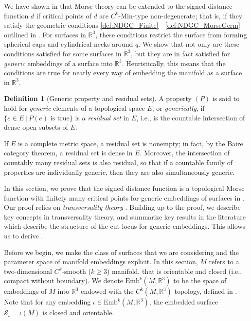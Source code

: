\documentclass[11pt]{article}
\newcommand{\R}{\mathbb{R}}
\newcommand{\Emb}{\mathrm{Emb}^k(M,\R^3)}
\newcommand{\Surf}{\mathcal{S}}
\theoremstyle{plain}
\theoremstyle{definition}
\newtheorem{defi}{Definition}
\theoremstyle{remark}
\begin{document}
We have shown in  that Morse theory can be extended to the signed distance function $d$ if critical points of $d$ are $C^k$-Min-type non-degenerate; that is, if they satisfy the  geometric conditions \ref{def:NDGC_Finite} - \ref{def:NDGC_MorseGerm} outlined in . 
For surfaces in $\R^3$, these conditions restrict the surface from forming spherical caps and cylindrical necks around $q$. 
We show that not only are these conditions satisfied for some surfaces in $\R^3$, but they are in fact satisfied for \textit{generic} embeddings of a surface into $\R^3$. 
Heuristically, this means that the conditions are true for nearly every way of embedding the manifold as a surface in $\R^3$. 

\begin{defi}[Generic property and residual sets]
A property $(P)$ is said to hold for \emph{generic} elements of a topological space $E$, or \emph{generically}, if 
$\{e \in E ~|~ P(e) \text{ is true} \}$
is a \emph{residual set} in $E$, i.e.,
is the countable intersection of dense open subsets of $E$.
\end{defi}

If $E$ is a complete metric space, a residual set is nonempty; in fact, by the Baire category theorem, a residual set is dense in $E$. Moreover, the intersection of countably many residual sets is also residual, so that if a countable family of properties are individually generic, then they are also simultaneously generic.

In this section, we prove that the signed distance function is a topological Morse function with finitely many critical points for generic embeddings of surfaces in . Our proof relies on \emph{transversality theory} \citep{guillemin_differential_2010}. Building up to the proof, we describe key concepts in transversality theory, and summarize key results in the literature which describe the structure of the cut locus for generic embeddings. This allows us to derive .


Before we begin, we make the class of surfaces that we are considering and the parameter space of manifold embeddings explicit. In this section, $M$ refers to a two-dimensional $C^k$-smooth ($k \geq 3$) manifold, that is orientable and closed (i.e., compact without boundary).
We denote $\Emb$ to be the space of embeddings of $M$ into $\R^3$ endowed with the $C^k(M,\R^3)$ topology, defined in \cite{hirsch_differential_1976}. Note that for any embedding $\iota \in \Emb$, the embedded surface $\Surf_\iota = \iota(M)$ is closed and orientable. 
\end{document}
